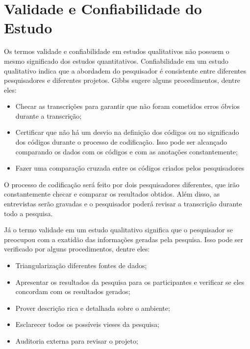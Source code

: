 
\section{Validade e Confiabilidade do Estudo}
\label{sec:planejamento-validacao}

Os termos validade e confiabilidade em estudos qualitativos não possuem o mesmo significado dos estudos quantitativos. 
Confiabilidade em um estudo qualitativo indica que a abordadem do pesquisador é consistente entre diferentes pesquisadores
e diferentes projetos. Gibbs \cite{gibbs} sugere alguns procedimentos, dentre eles:

\begin{itemize}
	\item Checar as transcrições para garantir que não foram cometidos erros óbvios durante a transcrição;
	\item Certificar que não há um desvio na definição dos códigos ou no significado dos códigos durante o processo de codificação. Isso pode ser alcançado comparando os dados com os códigos e com as anotações constantemente;
	\item Fazer uma comparação cruzada entre os códigos criados pelos pesquisadores
\end{itemize}

O processo de codificação será feito por dois pesquisadores diferentes, que irão constantemente checar e comparar os resultados
obtidos. Além disso, as entrevistas serão gravadas e o pesquisador poderá revisar a transcrição durante todo a pesquisa.

Já o termo validade em um estudo qualitativo significa que o pesquisador se preocupou com a exatidão das informações
geradas pela pesquisa. Isso pode ser verificado por alguns procedimentos, dentre eles:

\begin{itemize}
	\item Triangularização diferentes fontes de dados;
	\item Apresentar os resultados da pesquisa para os participantes e verificar se eles concordam com os resultados gerados;
	\item Prover descrição rica e detalhada sobre o ambiente;
	\item Esclarecer todos os possíveis vieses da pesquisa;
	\item Auditoria externa para revisar o projeto;
\end{itemize}

